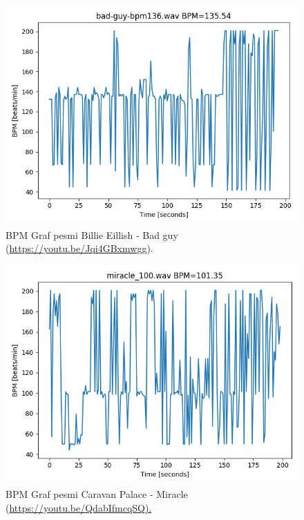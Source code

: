 \documentclass[a4paper,11pt]{article}
\begin{document}
\begin{figure}[htpb]
\begin{center}
\includegraphics[scale=0.6]{images/bg_bpm.png}
\caption{BPM Graf pesmi Billie Eillish - Bad guy (\url{https://youtu.be/Jqi4GBxmwgg}).}
\label{bpm_bag_guy}
\end{center}
\end{figure}

\begin{figure}[htpb]
\begin{center}
\includegraphics[scale=0.6]{images/miracle_bpm.png}
\caption{BPM Graf pesmi Caravan Palace - Miracle (\url{https://youtu.be/QdabIfmcqSQ).}}
\label{bpm_miracle}
\end{center}
\end{figure}
\end{document}
